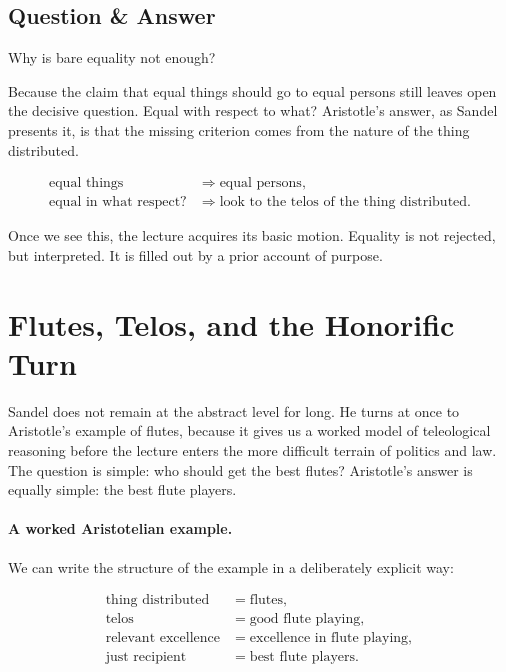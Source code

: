 \subsection{Question \& Answer}

Why is bare equality not enough?

Because the claim that equal things should go to equal persons still leaves open the decisive question. Equal with respect to what? Aristotle's answer, as Sandel presents it, is that the missing criterion comes from the nature of the thing distributed.

\begin{align}
\text{equal things} &\Longrightarrow \text{equal persons},\\
\text{equal in what respect?} &\Longrightarrow \text{look to the telos of the thing distributed}.
\end{align}

Once we see this, the lecture acquires its basic motion. Equality is not rejected, but interpreted. It is filled out by a prior account of purpose.

\section{Flutes, Telos, and the Honorific Turn}

Sandel does not remain at the abstract level for long. He turns at once to Aristotle's example of flutes, because it gives us a worked model of teleological reasoning before the lecture enters the more difficult terrain of politics and law. The question is simple: who should get the best flutes? Aristotle's answer is equally simple: the best flute players.

\paragraph{A worked Aristotelian example.}

We can write the structure of the example in a deliberately explicit way:

\begin{align}
\text{thing distributed} &= \text{flutes},\\
\text{telos} &= \text{good flute playing},\\
\text{relevant excellence} &= \text{excellence in flute playing},\\
\text{just recipient} &= \text{best flute players}.
\end{align}

